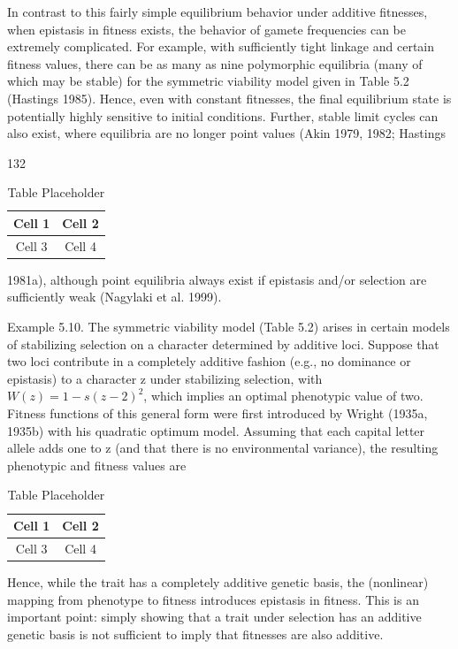 \documentclass{article}
\begin{document}
In contrast to this fairly simple equilibrium behavior under additive fitnesses, when epistasis in fitness exists, the behavior of gamete frequencies can be extremely complicated. For example, with sufficiently tight linkage and certain fitness values, there can be as many as nine polymorphic equilibria (many of which may be stable) for the symmetric viability model given in Table 5.2 (Hastings 1985). Hence, even with constant fitnesses, the final equilibrium state is potentially highly sensitive to initial conditions. Further, stable limit cycles can also exist, where equilibria are no longer point values (Akin 1979, 1982; Hastings

132

\begin{table}[h]
\centering
\begin{tabular}{|c|c|}
\hline
Cell 1 & Cell 2 \\
\hline
Cell 3 & Cell 4 \\
\hline
\end{tabular}
\caption{Table Placeholder}
\end{table}

1981a), although point equilibria always exist if epistasis and/or selection are sufficiently weak (Nagylaki et al. 1999).

Example 5.10. The symmetric viability model (Table 5.2) arises in certain models of stabilizing selection on a character determined by additive loci. Suppose that two loci contribute in a completely additive fashion (e.g., no dominance or epistasis) to a character z under stabilizing selection, with  $ W(z) = 1 - s(z - 2)^2 $, which implies an optimal phenotypic value of two. Fitness functions of this general form were first introduced by Wright (1935a, 1935b) with his quadratic optimum model. Assuming that each capital letter allele adds one to z (and that there is no environmental variance), the resulting phenotypic and fitness values are

\begin{table}[h]
\centering
\begin{tabular}{|c|c|}
\hline
Cell 1 & Cell 2 \\
\hline
Cell 3 & Cell 4 \\
\hline
\end{tabular}
\caption{Table Placeholder}
\end{table}

Hence, while the trait has a completely additive genetic basis, the (nonlinear) mapping from phenotype to fitness introduces epistasis in fitness. This is an important point: simply showing that a trait under selection has an additive genetic basis is not sufficient to imply that fitnesses are also additive.
\end{document}
